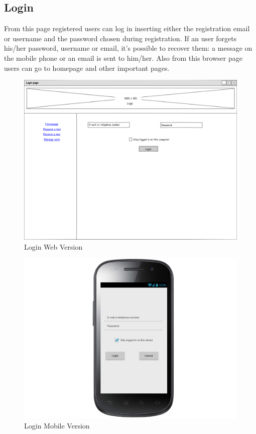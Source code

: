 \subsection{Login}
From this page registered users can log in inserting either the registration email or username and the password chosen during registration. \newline If an user forgets his/her password, username or email, it's possible to recover them: a message on the mobile phone or an email is sent to him/her. \newline Also from this browser page users can go to homepage and other important pages.
\begin{figure}[H]
\centering
\includegraphics[scale=0.35]{mockups/login_web.png}
\caption{Login Web Version}
\end{figure}
\begin{figure}[H]
\centering
\includegraphics[scale=0.35]{mockups/login_mobile.png}
\caption{Login Mobile Version}
\end{figure}
\break
